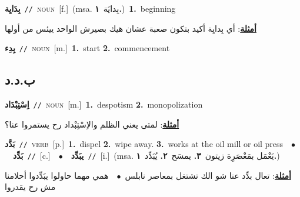 \documentclass[10pt,a4paper,twoside]{article} %
\begin{document}
\begin{multicols}{2}
{\setlength\topsep{0pt}\textbf{\foreignlanguage{arabic}{بِدَايِة}}\ {\color{gray}\texttt{//}\color{black}}\ \textsc{noun}\ [f.]\ \color{gray}(msa. \foreignlanguage{arabic}{بِدايَة}~\foreignlanguage{arabic}{\textbf{١.}})\color{black}\ \textbf{1.}~beginning\  \begin{flushright}\color{gray}\foreignlanguage{arabic}{\textbf{\underline{\foreignlanguage{arabic}{أمثلة}}}: أي بِدايِة أكيد بتكون صعبة عشان هيك بصيرش الواحد ييئس من أولها}\end{flushright}\color{black}} \vspace{2mm}

{\setlength\topsep{0pt}\textbf{\foreignlanguage{arabic}{بِدِء}}\ {\color{gray}\texttt{//}\color{black}}\ \textsc{noun}\ [m.]\ \textbf{1.}~start  \textbf{2.}~commencement\ } \vspace{2mm}

\vspace{-3mm}
\subsection*{\color{blue}\foreignlanguage{arabic}{ب.د.د}\color{blue}{}} 

{\setlength\topsep{0pt}\textbf{\foreignlanguage{arabic}{اِسْتِبْدَاد}}\ {\color{gray}\texttt{//}\color{black}}\ \textsc{noun}\ [m.]\ \textbf{1.}~despotism  \textbf{2.}~monopolization\  \begin{flushright}\color{gray}\foreignlanguage{arabic}{\textbf{\underline{\foreignlanguage{arabic}{أمثلة}}}: لمتى يعني الظلم والاِسْتِبْداد رح يستمروا عنا؟}\end{flushright}\color{black}} \vspace{2mm}

{\setlength\topsep{0pt}\textbf{\foreignlanguage{arabic}{بَدَّد}}\ {\color{gray}\texttt{//}\color{black}}\ \textsc{verb}\ [p.]\ \textbf{1.}~dispel  \textbf{2.}~wipe away.  \textbf{3.}~works at the oil mill or oil press\ \ $\bullet$\ \ \setlength\topsep{0pt}\textbf{\foreignlanguage{arabic}{بَدِّد}}\ {\color{gray}\texttt{//}\color{black}}\ [c.]\ \ $\bullet$\ \ \setlength\topsep{0pt}\textbf{\foreignlanguage{arabic}{يبَدِّد}}\ {\color{gray}\texttt{//}\color{black}}\ [i.]\ \color{gray}(msa. \foreignlanguage{arabic}{يَعْمَل بمَعْصَرِة زيتون}~\foreignlanguage{arabic}{\textbf{٣.}}  \foreignlanguage{arabic}{يمسَح}~\foreignlanguage{arabic}{\textbf{٢.}}  \foreignlanguage{arabic}{يُبَدِّد}~\foreignlanguage{arabic}{\textbf{١.}})\color{black}\  \begin{flushright}\color{gray}\foreignlanguage{arabic}{\textbf{\underline{\foreignlanguage{arabic}{أمثلة}}}: تعال بدِّد عنا شو الك تشتغل بمعاصر نابلس\ $\bullet$\ \  همي مهما حاولوا يبَدِّدوا أحلامنا مش رح يقدروا}\end{flushright}\color{black}} \vspace{2mm}


\end{multicols}
\end{document}
